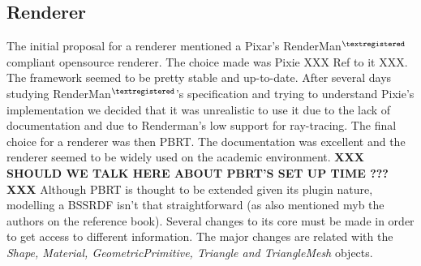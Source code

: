 \documentclass{article}
\begin{document}
\subsection{Renderer}
The initial proposal for a renderer mentioned a Pixar's RenderMan$^{\textregistered}$ compliant opensource renderer. The choice made was Pixie XXX Ref to it XXX. The framework seemed to be pretty stable and up-to-date. After several days studying RenderMan$^{\textregistered}$'s specification and trying to understand Pixie's implementation we decided that it was unrealistic to use it due to the lack of documentation and due to Renderman's low support for ray-tracing.\linebreak
The final choice for a renderer was then PBRT. The documentation was excellent and the renderer seemed to be widely used on the academic environment.\linebreak
\textbf{ XXX SHOULD WE TALK HERE ABOUT PBRT'S SET UP TIME ??? XXX }
Although PBRT is thought to be extended given its plugin nature, modelling a BSSRDF isn't that straightforward (as also mentioned myb the authors on the reference book). Several changes to its core must be made in order to get access to different information. The major changes are related with the {\it Shape, Material, GeometricPrimitive, Triangle and TriangleMesh} objects.
\end{document}
